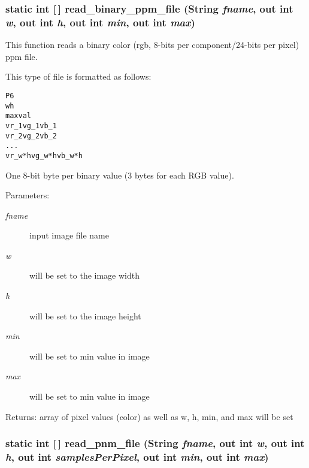 \subsubsection{\setlength{\rightskip}{0pt plus 5cm}static int [$\,$] read\_\-binary\_\-ppm\_\-file (String {\em fname}, out int {\em w}, out int {\em h}, out int {\em min}, out int {\em max})\hspace{0.3cm}{\tt  [static, protected]}}\label{class_c_s_image_viewer_1_1pnm_helper_995555dda732256678609a16427524aa}


This function reads a binary color (rgb, 8-bits per component/24-bits per pixel) ppm file. 

This type of file is formatted as follows: \small\begin{alltt}
    P6
    w h
    maxval
    vr\_1 vg\_1 vb\_1 
    vr\_2 vg\_2 vb\_2
    . . .
    vr\_w*h vg\_w*h vb\_w*h
  \end{alltt}\normalsize 
 One 8-bit byte per binary value (3 bytes for each RGB value).

\begin{Desc}
\item[Parameters:]
\begin{description}
\item[{\em fname}]input image file name \item[{\em w}]will be set to the image width \item[{\em h}]will be set to the image height \item[{\em min}]will be set to min value in image \item[{\em max}]will be set to min value in image\end{description}
\end{Desc}
\begin{Desc}
\item[Returns:]array of pixel values (color) as well as w, h, min, and max will be set \end{Desc}
\subsubsection{\setlength{\rightskip}{0pt plus 5cm}static int [$\,$] read\_\-pnm\_\-file (String {\em fname}, out int {\em w}, out int {\em h}, out int {\em samples\-Per\-Pixel}, out int {\em min}, out int {\em max})\hspace{0.3cm}{\tt  [static]}}\label{class_c_s_image_viewer_1_1pnm_helper_5f89692349ec01bcc8017090c900c15f}


